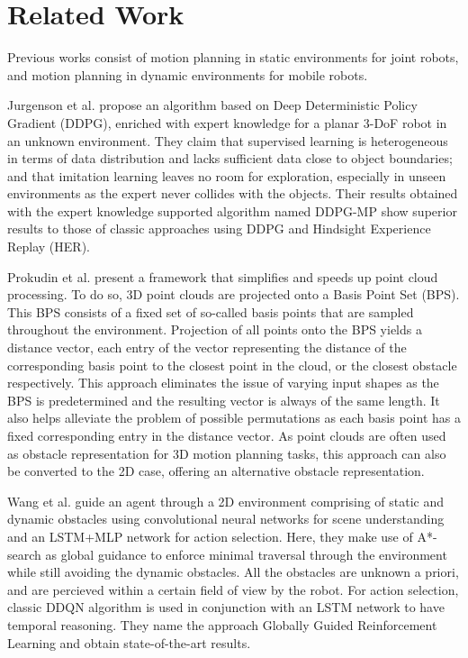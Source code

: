 \documentclass[conference]{IEEEtran}
\begin{document}
\section{Related Work}

Previous works consist of motion planning in static environments for joint robots, and motion planning in dynamic environments for mobile robots. 

Jurgenson et al. \cite{b1} propose an algorithm based on Deep Deterministic Policy Gradient (DDPG), enriched with expert knowledge for a planar 3-DoF robot in an unknown environment. They claim that supervised learning is heterogeneous in terms of data distribution and lacks sufficient data close to object boundaries; and that imitation learning leaves no room for exploration, especially in unseen environments as the expert never collides with the objects. Their results obtained with the expert knowledge supported algorithm named DDPG-MP show superior results to those of classic approaches using DDPG and Hindsight Experience Replay (HER).

Prokudin et al. \cite{b2} present a framework that simplifies and speeds up point cloud processing. To do so, 3D point clouds are projected onto a Basis Point Set (BPS). This BPS consists of a fixed set of so-called basis points that are sampled throughout the environment. Projection of all points onto the BPS yields a distance vector, each entry of the vector representing the distance of the corresponding basis point to the closest point in the cloud, or the closest obstacle respectively. This approach eliminates the issue of varying input shapes as the BPS is predetermined and the resulting vector is always of the same length. It also helps alleviate the problem of possible permutations as each basis point has a fixed corresponding entry in the distance vector. As point clouds are often used as obstacle representation for 3D motion planning tasks, this approach can also be converted to the 2D case, offering an alternative obstacle representation.

Wang et al. \cite{b3} guide an agent through a 2D environment comprising of static and dynamic obstacles using convolutional neural networks for scene understanding and an LSTM+MLP network for action selection. Here, they make use of A*-search as global guidance to enforce minimal traversal through the environment while still avoiding the dynamic obstacles. All the obstacles are unknown a priori, and are percieved within a certain field of view by the robot. For action selection, classic DDQN algorithm is used in conjunction with an LSTM network to have temporal reasoning. They name the approach Globally Guided Reinforcement Learning and obtain state-of-the-art results. 
\end{document}
